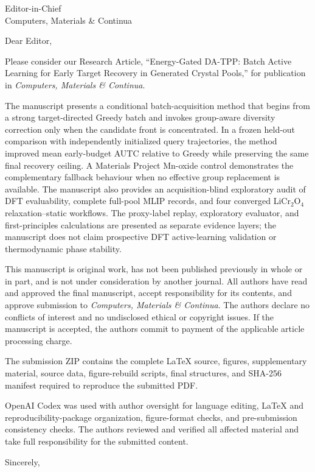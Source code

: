\documentclass[11pt]{letter}
\date{August 10, 2026}
\begin{document}
\begin{letter}{Editor-in-Chief\\Computers, Materials \& Continua}
\opening{Dear Editor,}

Please consider our Research Article, ``Energy-Gated DA-TPP: Batch Active
Learning for Early Target Recovery in Generated Crystal Pools,'' for publication
in \emph{Computers, Materials \& Continua}.

The manuscript presents a conditional batch-acquisition method that begins from
a strong target-directed Greedy batch and invokes group-aware diversity
correction only when the candidate front is concentrated. In a frozen
held-out comparison with independently initialized query trajectories, the
method improved mean early-budget AUTC relative to Greedy while preserving the
same final recovery ceiling. A Materials Project Mn-oxide control demonstrates
the complementary fallback behaviour when no effective group replacement is
available. The manuscript also provides an acquisition-blind exploratory audit
of DFT evaluability, complete full-pool MLIP records, and four converged
LiCr$_2$O$_4$ relaxation--static workflows. The proxy-label replay, exploratory
evaluator, and first-principles calculations are presented as separate evidence
layers; the manuscript does not claim prospective DFT active-learning validation
or thermodynamic phase stability.

This manuscript is original work, has not been published previously in whole or
in part, and is not under consideration by another journal. All authors have
read and approved the final manuscript, accept responsibility for its contents,
and approve submission to \emph{Computers, Materials \& Continua}. The authors
declare no conflicts of interest and no undisclosed ethical or copyright issues.
If the manuscript is accepted, the authors commit to payment of the applicable
article processing charge.

The submission ZIP contains the complete LaTeX source, figures, supplementary
material, source data, figure-rebuild scripts, final structures, and SHA-256
manifest required to reproduce the submitted PDF.

OpenAI Codex was used with author oversight for language editing, LaTeX and
reproducibility-package organization, figure-format checks, and pre-submission
consistency checks. The authors reviewed and verified all affected material and
take full responsibility for the submitted content.

\closing{Sincerely,}
\end{letter}
\end{document}
